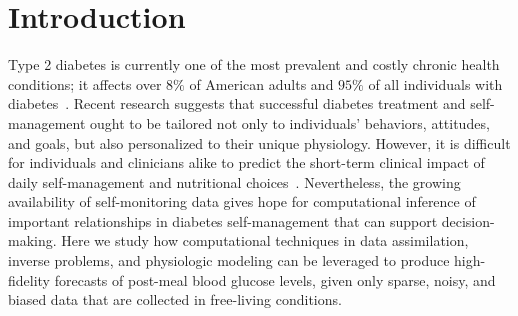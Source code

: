 \documentclass[10pt,letterpaper]{article}
\begin{document}

\section{Introduction}
Type 2 diabetes is currently one of the most prevalent and costly chronic health conditions; it affects over $8\%$ of American adults and $95\%$ of all individuals with diabetes~\cite{ADA_standards_2014}. Recent research suggests that successful diabetes treatment and self-management ought to be tailored not only to individuals' behaviors, attitudes, and goals, but also personalized to their unique physiology. However, it is difficult for individuals and clinicians alike to predict the short-term clinical impact of daily self-management and nutritional choices~\cite{mamykina_data-driven_2016}. Nevertheless, the growing availability of self-monitoring data gives hope for computational inference of important relationships in diabetes self-management that can support decision-making. Here we study how computational techniques in data assimilation, inverse problems, and physiologic modeling can be leveraged to produce high-fidelity forecasts of post-meal blood glucose levels, given only sparse, noisy, and biased data that are collected in free-living conditions. 
\end{document}
